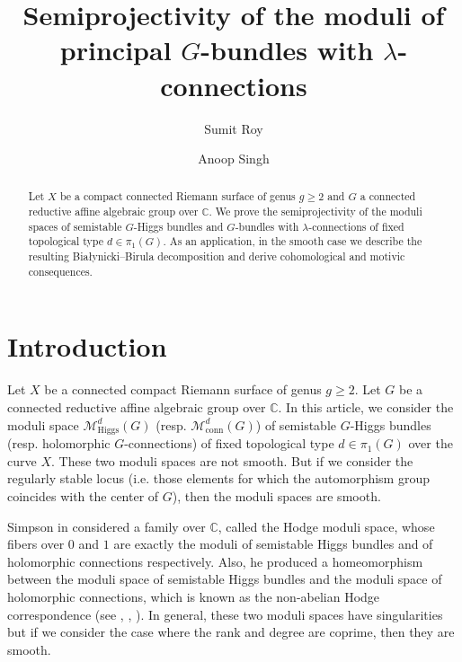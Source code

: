\documentclass[11pt, reqno]{amsart}
\numberwithin{equation}{section}
\theoremstyle{definition}
\begin{document}
	\title[Semiprojectivity of principal $G$-bundles with $\lambda$-connections]
	{Semiprojectivity of the moduli of principal $G$-bundles with $\lambda$-connections}
	
	\author[S. Roy]{Sumit Roy}
 \address{Stat-Math Unit, Indian Statistical Institute, 203 B.T. Road, Kolkata 700 108, India.}
	
	
 \author[A. Singh]{Anoop Singh}
\address{Department of Mathematical Sciences, Indian Institute of Technology (BHU), Varanasi- 221 005, India.}

	\begin{abstract}
	    Let $X$ be a compact connected Riemann surface of genus $g \geq 2$ and $G$  a connected reductive affine algebraic group over $\mathbb{C}$. We prove the semiprojectivity of the moduli spaces of semistable $G$-Higgs bundles and $G$-bundles with $\lambda$-connections of fixed topological type $d\in \pi_1(G)$. As an application, in the smooth case we describe the resulting Białynicki–Birula decomposition and derive cohomological and motivic consequences.
	\end{abstract}
	\maketitle
	
	\section{Introduction}
	Let $X$ be a connected compact Riemann surface of genus $g \geq 2$. Let $G$ be a connected reductive affine algebraic group over $\mathbb{C}$. In this article, we consider the moduli space $\mathcal{M}^d_{\mathrm{Higgs}}(G)$ (resp. $\mathcal{M}^d_{\mathrm{conn}}(G)$) of semistable $G$-Higgs bundles (resp. holomorphic $G$-connections) of fixed topological type $d \in \pi_1(G)$ over the curve $X$. These two moduli spaces are not smooth. But if we consider the regularly stable locus (i.e. those elements for which the automorphism group coincides with the center of $G$), then the moduli spaces are smooth. 

 	Simpson in \cite{S94a} considered a family over $\mathbb{C}$, called the Hodge moduli space, whose fibers over $0$ and $1$ are exactly the moduli of semistable Higgs bundles and of holomorphic connections respectively. Also, he produced a homeomorphism between the moduli space of semistable Higgs bundles and the moduli space of holomorphic connections, which is known as the non-abelian Hodge correspondence (see \cite{S92}, \cite{S94a}, \cite{S94}). In general,  these two moduli spaces have singularities but if we consider the case where the rank and degree are coprime, then they are smooth.
\end{document}
